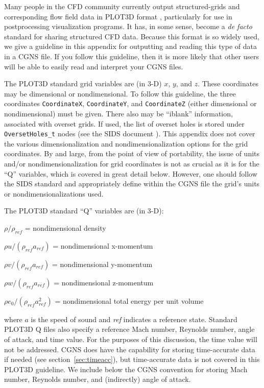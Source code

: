 \documentclass[12pt]{article}
\begin{document}
Many people in the CFD community currently output structured-grids and
corresponding flow field data in PLOT3D
format \cite{WALATKA}, particularly for use in postprocessing visualization
programs.  It has, in some sense, become a {\it de facto} standard for
sharing structured CFD data.  Because this format is so widely used, we give
a guideline in this appendix for outputting and reading this type
of data in a CGNS file.  If you follow this guideline, then it is more likely
that other users will be able to easily read and interpret your
CGNS files.  

The PLOT3D standard grid variables are (in 3-D) $x$, $y$, and $z$.  These
coordinates may be dimensional or nondimensional.  To follow this
guideline, the three coordinates {\tt CoordinateX}, {\tt CoordinateY}, and
{\tt CoordinateZ} (either dimensional
or nondimensional) must be given.  There also may be
``iblank'' information, associated with overset grids.  
If used, the list of overset holes
is stored under {\tt OversetHoles\_t} nodes 
(see the SIDS document \cite{ALLMARAS}).  This appendix does not cover
the various dimensionalization and nondimensionalization
options for the grid coordinates.  By and large, from the point of view
of portability, the issue of units and/or nondimensionalization for
grid coordinates is not as crucial
as it is for the ``Q'' variables, which is covered in great detail below.
However, one should follow the SIDS standard and appropriately define
within the CGNS file the grid's units or nondimensionalizations used.

The PLOT3D standard ``Q'' variables are (in 3-D):

$\rho/\rho_{ref}$ = nondimensional density

$\rho u/(\rho_{ref}a_{ref})$ = nondimensional x-momentum

$\rho v/(\rho_{ref}a_{ref})$ = nondimensional y-momentum

$\rho w/(\rho_{ref}a_{ref})$ = nondimensional z-momentum

$\rho e_0/(\rho_{ref}a_{ref}^2)$ = nondimensional total energy per unit volume

\noindent where $a$ is the speed of sound and {\it ref} indicates
a reference state.  Standard PLOT3D Q files also
specify a reference Mach number, Reynolds number, angle of attack, and
time value.  For the purposes of this discussion, the time value will
not be addressed.
CGNS does have the capability for storing time-accurate data if
needed (see section~\ref{sec:timeacc}), but time-accurate data
is not covered in this PLOT3D guideline.
We include below the CGNS convention for
storing Mach number, Reynolds number, and (indirectly) angle of attack.
\end{document}
